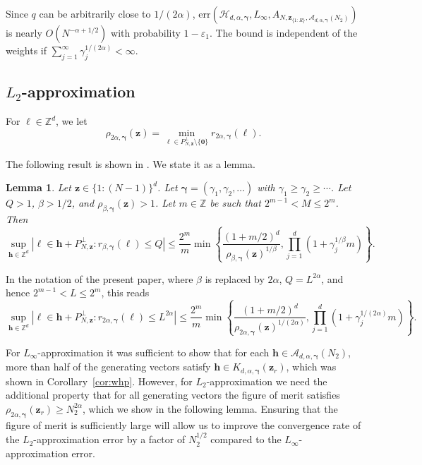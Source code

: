 \documentclass[a4paper,11pt]{article}
\newtheorem{lemma}[theorem]{Lemma}
\newcommand{\bszero}{\boldsymbol{0}}
\newcommand{\bsh}{\boldsymbol{h}}
\newcommand{\bsl}{\boldsymbol{\ell}}
\newcommand{\bsz}{\boldsymbol{z}}
\newcommand{\bsgamma}{\boldsymbol{\gamma}}
\newcommand{\ZZ}{\mathbb{Z}}
\newcommand{\Acal}{\mathcal{A}}
\newcommand{\Hcal}{\mathcal{H}}
\begin{document}
Since $q$ can be arbitrarily close to $1/(2\alpha)$, $\mathrm{err}(\Hcal_{d,\alpha,\bsgamma}, L_\infty, A_{N,\bsz_{\{1{:}R\}},\Acal_{d,\alpha,\bsgamma}(N_2)})$ is nearly $O(N^{-\alpha+1/2})$ with probability $1-\varepsilon_1$. The bound is independent of the weights if $\sum_{j=1}^\infty \gamma_j^{1/(2\alpha)} < \infty$.



\subsection{$L_2$-approximation}

For $\bsl\in \ZZ^d$, we let
$$\rho_{2\alpha, \bsgamma}(\bsz)=\min_{\bsl\in P^\perp_{N,\bsz}\setminus\{\bszero\}} r_{2\alpha,\bsgamma}(\bsl).$$


The following result is shown in \cite[Eq. (3.9)]{CDG25}. We state it as a lemma.
\begin{lemma}
Let $\bsz \in \{1{:}(N-1)\}^d$. Let $\bsgamma = (\gamma_1, \gamma_2, \ldots)$ with $\gamma_1 \ge \gamma_2 \ge \cdots$. Let $Q > 1$, $\beta>1/2$, and $\rho_{\beta, \bsgamma}(\bsz) > 1$. Let $m \in \mathbb{Z}$ be such that $2^{m-1} < M\le 2^m$. Then
\begin{equation*}
\sup_{\bsh \in \mathbb{Z}^d} \left| \bsl \in \bsh + P^\perp_{N, \bsz} : r_{\beta, \bsgamma}(\bsl) \le Q \right|   \le \frac{2^m}{m} \min \left\{ \frac{(1 + m/2)^d}{\rho_{\beta, \bsgamma}(\bm{z})^{1/\beta}}, \prod_{j=1}^d (1 + \gamma_j^{1/\beta} m)  \right\}.
\end{equation*}
\end{lemma}
In the notation of the present paper, where $\beta$ is replaced by $2 \alpha$, $Q = L^{2\alpha}$, and hence $2^{m-1} < L \le 2^m$, this reads
\begin{equation}\label{fiber:bound}
\sup_{\bsh \in \mathbb{Z}^d} \left| \bsl \in \bsh + P^\perp_{N, \bsz} : r_{2 \alpha, \bsgamma}(\bsl) \le L^{2\alpha}  \right|  \le \frac{2^m}{m} \min \left\{ \frac{(1 + m/2)^d}{\rho_{2 \alpha, \bsgamma}(\bm{z})^{1/(2\alpha) }}, \prod_{j=1}^d (1 + \gamma_j^{1/(2\alpha) } m)  \right\}.
\end{equation}

For $L_\infty$-approximation it was sufficient to show that for each $\bsh \in \Acal_{d,\alpha, \bsgamma}(N_2)$, more than half of the generating vectors satisfy $\bsh \in K_{d,\alpha, \bsgamma}(\bsz_r)$, which was shown in Corollary~\ref{cor:whp}. However, for $L_2$-approximation we need the additional property that for all generating vectors the figure of merit satisfies $\rho_{2\alpha, \bsgamma}(\bsz_r) \ge N_2^{2\alpha}$, which we show in the following lemma. Ensuring that the figure of merit is sufficiently large will allow us to improve the convergence rate of the $L_2$-approximation error by a factor of $N_2^{1/2}$ compared to the $L_\infty$-approximation error.
\end{document}
